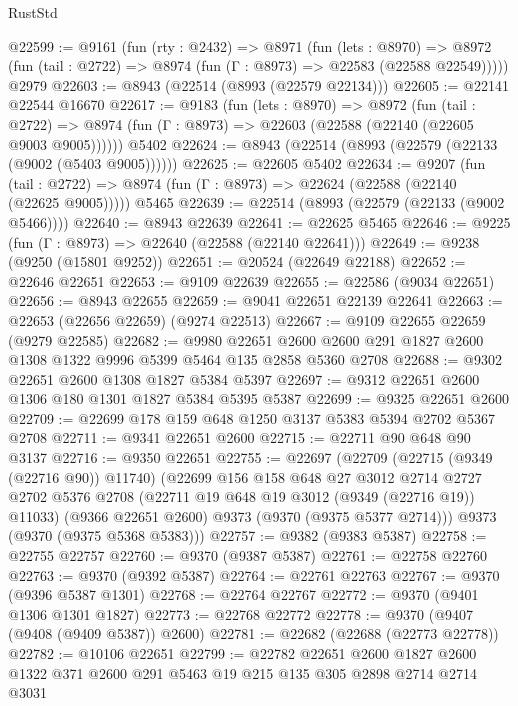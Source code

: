 \begin{lexlean}{RustStd}
\begin{coremodule}
@22599 := @9161
    (fun (rty : @2432) =>
    @8971
      (fun (lets : @8970) =>
      @8972 (fun (tail : @2722) => @8974 (fun (Γ : @8973) => @22583 (@22588 @22549)))))
    @2979
@22603 := @8943 (@22514 (@8993 (@22579 @22134)))
@22605 := @22141 @22544 @16670
@22617 := @9183
    (fun (lets : @8970) =>
    @8972
      (fun (tail : @2722) =>
      @8974 (fun (Γ : @8973) => @22603 (@22588 (@22140 (@22605 @9003 @9005))))))
    @5402
@22624 := @8943 (@22514 (@8993 (@22579 (@22133 (@9002 (@5403 @9005))))))
@22625 := @22605 @5402
@22634 := @9207
    (fun (tail : @2722) => @8974 (fun (Γ : @8973) => @22624 (@22588 (@22140 (@22625 @9005)))))
    @5465
@22639 := @22514 (@8993 (@22579 (@22133 (@9002 @5466))))
@22640 := @8943 @22639
@22641 := @22625 @5465
@22646 := @9225 (fun (Γ : @8973) => @22640 (@22588 (@22140 @22641)))
@22649 := @9238 (@9250 (@15801 @9252))
@22651 := @20524 (@22649 @22188)
@22652 := @22646 @22651
@22653 := @9109 @22639
@22655 := @22586 (@9034 @22651)
@22656 := @8943 @22655
@22659 := @9041 @22651 @22139 @22641
@22663 := @22653 (@22656 @22659) (@9274 @22513)
@22667 := @9109 @22655 @22659 (@9279 @22585)
@22682 := @9980
    @22651
    @2600
    @2600
    @291
    @1827
    @2600
    @1308
    @1322
    @9996
    @5399
    @5464
    @135
    @2858
    @5360
    @2708
@22688 := @9302 @22651 @2600 @1308 @1827 @5384 @5397
@22697 := @9312 @22651 @2600 @1306 @180 @1301 @1827 @5384 @5395 @5387
@22699 := @9325 @22651 @2600
@22709 := @22699 @178 @159 @648 @1250 @3137 @5383 @5394 @2702 @5367 @2708
@22711 := @9341 @22651 @2600
@22715 := @22711 @90 @648 @90 @3137
@22716 := @9350 @22651
@22755 := @22697
    (@22709
      (@22715 (@9349 (@22716 @90)) @11740)
      (@22699
        @156
        @158
        @648
        @27
        @3012
        @2714
        @2727
        @2702
        @5376
        @2708
        (@22711 @19 @648 @19 @3012 (@9349 (@22716 @19)) @11033)
        (@9366 @22651 @2600)
        @9373
        (@9370 (@9375 @5377 @2714)))
      @9373
      (@9370 (@9375 @5368 @5383)))
@22757 := @9382 (@9383 @5387)
@22758 := @22755 @22757
@22760 := @9370 (@9387 @5387)
@22761 := @22758 @22760
@22763 := @9370 (@9392 @5387)
@22764 := @22761 @22763
@22767 := @9370 (@9396 @5387 @1301)
@22768 := @22764 @22767
@22772 := @9370 (@9401 @1306 @1301 @1827)
@22773 := @22768 @22772
@22778 := @9370 (@9407 (@9408 (@9409 @5387)) @2600)
@22781 := @22682 (@22688 (@22773 @22778))
@22782 := @10106 @22651
@22799 := @22782
    @22651
    @2600
    @1827
    @2600
    @1322
    @371
    @2600
    @291
    @5463
    @19
    @215
    @135
    @305
    @2898
    @2714
    @2714
    @3031

\end{coremodule}
\end{lexlean}
